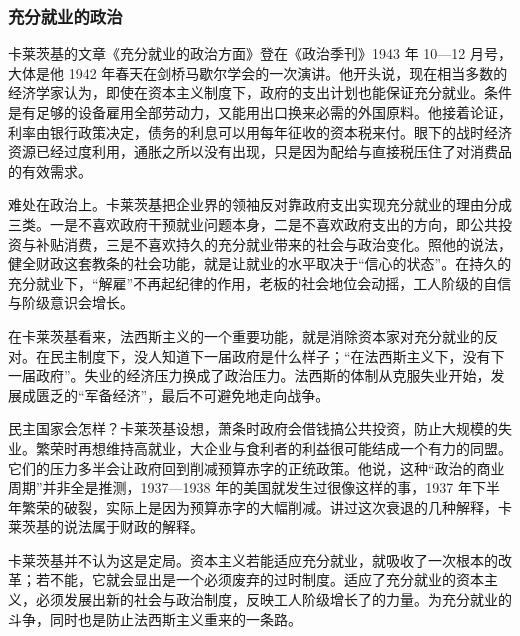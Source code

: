 \subsubsection{充分就业的政治}
卡莱茨基的文章《充分就业的政治方面》登在《政治季刊》1943 年 10—12 月号，大体是他 1942 年春天在剑桥马歇尔学会的一次演讲\cite{kalecki1943}。他开头说，现在相当多数的经济学家认为，即使在资本主义制度下，政府的支出计划也能保证充分就业\cite{kalecki1943}。条件是有足够的设备雇用全部劳动力，又能用出口换来必需的外国原料\cite{kalecki1943}。他接着论证，利率由银行政策决定，债务的利息可以用每年征收的资本税来付\cite{kalecki1943}。眼下的战时经济资源已经过度利用，通胀之所以没有出现，只是因为配给与直接税压住了对消费品的有效需求\cite{kalecki1943}。

难处在政治上。卡莱茨基把企业界的领袖反对靠政府支出实现充分就业的理由分成三类\cite{kalecki1943}。一是不喜欢政府干预就业问题本身，二是不喜欢政府支出的方向，即公共投资与补贴消费，三是不喜欢持久的充分就业带来的社会与政治变化\cite{kalecki1943}。照他的说法，健全财政这套教条的社会功能，就是让就业的水平取决于“信心的状态”\cite{kalecki1943}。在持久的充分就业下，“解雇”不再起纪律的作用，老板的社会地位会动摇，工人阶级的自信与阶级意识会增长\cite{kalecki1943}。

在卡莱茨基看来，法西斯主义的一个重要功能，就是消除资本家对充分就业的反对\cite{kalecki1943}。在民主制度下，没人知道下一届政府是什么样子；“在法西斯主义下，没有下一届政府”\cite{kalecki1943}。失业的经济压力换成了政治压力\cite{kalecki1943}。法西斯的体制从克服失业开始，发展成匮乏的“军备经济”，最后不可避免地走向战争\cite{kalecki1943}。

民主国家会怎样？卡莱茨基设想，萧条时政府会借钱搞公共投资，防止大规模的失业\cite{kalecki1943}。繁荣时再想维持高就业，大企业与食利者的利益很可能结成一个有力的同盟。它们的压力多半会让政府回到削减预算赤字的正统政策\cite{kalecki1943}。他说，这种“政治的商业周期”并非全是推测，1937—1938 年的美国就发生过很像这样的事，1937 年下半年繁荣的破裂，实际上是因为预算赤字的大幅削减\cite{kalecki1943}。讲过这次衰退的几种解释，卡莱茨基的说法属于财政的解释。

卡莱茨基并不认为这是定局。资本主义若能适应充分就业，就吸收了一次根本的改革；若不能，它就会显出是一个必须废弃的过时制度\cite{kalecki1943}。适应了充分就业的资本主义，必须发展出新的社会与政治制度，反映工人阶级增长了的力量\cite{kalecki1943}。为充分就业的斗争，同时也是防止法西斯主义重来的一条路\cite{kalecki1943}。

